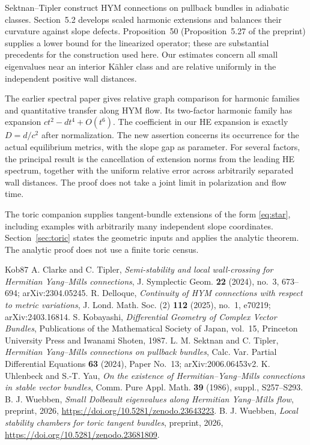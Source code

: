 \documentclass[11pt]{amsart}
\theoremstyle{remark}
\begin{document}
Sektnan--Tipler \cite{ST} construct HYM connections on pullback bundles
in adiabatic classes. Section~5.2 develops scaled
harmonic extensions and balances their curvature against slope defects.
Proposition~50 (Proposition~5.27 of the preprint) supplies a lower bound
for the linearized operator;
these are substantial precedents for the construction used here.
Our estimates concern all small eigenvalues near an interior K\"ahler
class and are relative uniformly in the independent positive wall
distances.

The earlier spectral paper \cite{Flow} gives relative graph comparison
for harmonic families and quantitative transfer along HYM flow. Its
two-factor harmonic family has expansion $ct^2-dt^4+O(t^6)$.
The coefficient in our HE expansion is exactly $D=d/c^2$ after
normalization. The new assertion concerns its occurrence for the
actual equilibrium metrics, with the slope gap as parameter.
For several factors, the principal result is the cancellation of
extension norms from the leading HE spectrum, together with the
uniform relative error across arbitrarily separated wall distances.
The proof does not take a joint limit in polarization and flow time.

The toric companion \cite{Chambers} supplies tangent-bundle extensions
of the form \eqref{eq:star}, including examples with arbitrarily many
independent slope coordinates. Section~\ref{sec:toric} states the
geometric inputs and applies the analytic theorem. The analytic proof
does not use a finite toric census.






\begin{thebibliography}{Kob87}
 A. Clarke and C. Tipler,
\emph{Semi-stability and local wall-crossing for Hermitian Yang--Mills
connections}, J. Symplectic Geom. \textbf{22} (2024), no.~3, 673--694;
arXiv:2304.05245.
 R. Delloque,
\emph{Continuity of HYM connections with respect to metric variations},
J. Lond. Math. Soc. (2) \textbf{112} (2025), no.~1, e70219;
arXiv:2403.16814.
 S. Kobayashi,
\emph{Differential Geometry of Complex Vector Bundles}, Publications
of the Mathematical Society of Japan, vol.~15, Princeton University
Press and Iwanami Shoten, 1987.
 L. M. Sektnan and C. Tipler,
\emph{Hermitian Yang--Mills connections on pullback bundles},
Calc. Var. Partial Differential Equations \textbf{63} (2024),
Paper No.~13; arXiv:2006.06453v2.
 K. Uhlenbeck and S.-T. Yau,
\emph{On the existence of Hermitian--Yang--Mills connections in stable
vector bundles}, Comm. Pure Appl. Math. \textbf{39} (1986),
suppl., S257--S293.
 B. J. Wuebben,
\emph{Small Dolbeault eigenvalues along Hermitian Yang--Mills flow},
preprint, 2026, \url{https://doi.org/10.5281/zenodo.23643223}.
 B. J. Wuebben,
\emph{Local stability chambers for toric tangent bundles},
preprint, 2026, \url{https://doi.org/10.5281/zenodo.23681809}.
\end{thebibliography}
\end{document}
